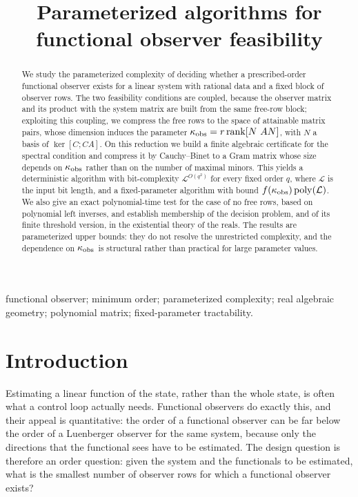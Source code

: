 \documentclass[journal]{IEEEtran}
\theoremstyle{plainn}
\theoremstyle{remark}
\begin{document}
\title{Parameterized algorithms for functional observer feasibility}
\author{}
\maketitle

\begin{abstract}
We study the parameterized complexity of deciding whether a prescribed-order functional
observer exists for a linear system with rational data and a fixed block of observer rows.
The two feasibility conditions are coupled, because the observer matrix and its product
with the system matrix are built from the same free-row block; exploiting this coupling, we
compress the free rows to the space of attainable matrix pairs, whose dimension induces the
parameter $\kappa_{\rm obs}=r\operatorname{rank}[N\ AN]$, with $N$ a basis of
$\ker[C;CA]$. On this reduction we build a finite algebraic certificate for the spectral
condition and compress it by Cauchy--Binet to a Gram matrix whose size depends on
$\kappa_{\rm obs}$ rather than on the number of maximal minors. This yields a deterministic
algorithm with bit-complexity $\mathcal L^{O(q^2)}$ for every fixed order $q$, where
$\mathcal L$ is the input bit length, and a fixed-parameter algorithm with bound
$f(\kappa_{\rm obs})\operatorname{poly}(\mathcal L)$. We also give an exact
polynomial-time test for the case of no free rows, based on polynomial left inverses, and
establish membership of the decision problem, and of its finite threshold version, in the
existential theory of the reals. The results are parameterized upper bounds: they do not
resolve the unrestricted complexity, and the dependence on $\kappa_{\rm obs}$ is structural
rather than practical for large parameter values.
\end{abstract}

\begin{IEEEkeywords}
functional observer; minimum order; parameterized complexity; real algebraic geometry; polynomial matrix; fixed-parameter tractability.
\end{IEEEkeywords}

\section{Introduction}\label{sec:intro}

Estimating a linear function of the state, rather than the whole state, is often what a
control loop actually needs. Functional observers do exactly this, and their appeal is
quantitative: the order of a functional observer can be far below the order of a
Luenberger observer for the same system, because only the directions that the functional
sees have to be estimated. The design question is therefore an order question: given the
system and the functionals to be estimated, what is the smallest number of observer rows
for which a functional observer exists?
\end{document}
